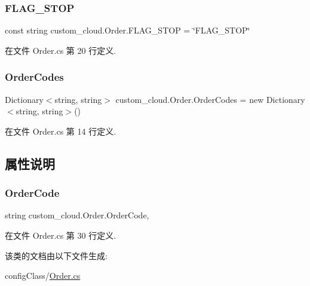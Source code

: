 \subsubsection{\texorpdfstring{F\+L\+A\+G\+\_\+\+S\+T\+OP}{FLAG\_STOP}}
{\footnotesize\ttfamily const string custom\+\_\+cloud.\+Order.\+F\+L\+A\+G\+\_\+\+S\+T\+OP = \char`\"{}F\+L\+A\+G\+\_\+\+S\+T\+OP\char`\"{}}



在文件 Order.\+cs 第 20 行定义.

\mbox{\label{classcustom__cloud_1_1_order_aa921c37a11f452a3eb706cbc98eadd47}} 
\subsubsection{\texorpdfstring{Order\+Codes}{OrderCodes}}
{\footnotesize\ttfamily Dictionary$<$string, string$>$ custom\+\_\+cloud.\+Order.\+Order\+Codes = new Dictionary$<$string, string$>$()}



在文件 Order.\+cs 第 14 行定义.



\subsection{属性说明}
\mbox{\label{classcustom__cloud_1_1_order_afea2b9669cfbec3d1c98aa7db6ffaa49}} 
\subsubsection{\texorpdfstring{Order\+Code}{OrderCode}}
{\footnotesize\ttfamily string custom\+\_\+cloud.\+Order.\+Order\+Code\hspace{0.3cm}{\ttfamily [get]}, {\ttfamily [set]}}



在文件 Order.\+cs 第 30 行定义.



该类的文档由以下文件生成\+:\begin{DoxyCompactItemize}
\item 
config\+Class/\hyperlink{_order_8cs}{Order.\+cs}\end{DoxyCompactItemize}
